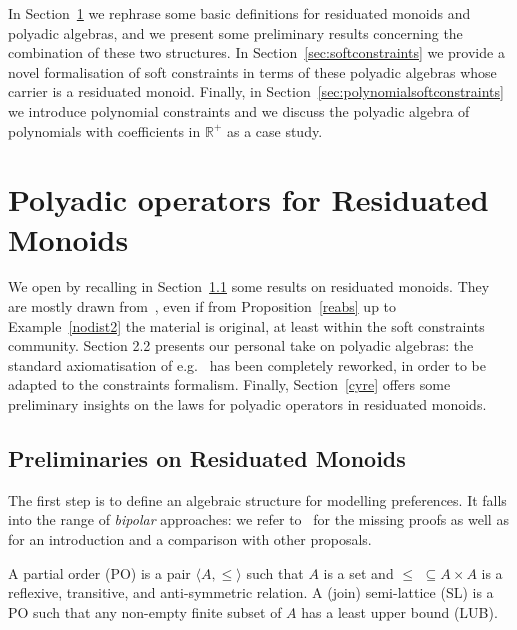 \documentclass{llncs}
\begin{document}
In Section~\ref{sec:bg} we rephrase some basic definitions for residuated monoids and polyadic algebras, and we present some preliminary results concerning the combination of 
these two structures.
%
In Section~\ref{sec:softconstraints} we provide a novel formalisation of soft constraints in terms of these polyadic algebras whose carrier is a residuated monoid. 
%
Finally, in Section~\ref{sec:polynomialsoftconstraints} we introduce polynomial constraints and we discuss the polyadic algebra of polynomials with coefficients in $\mathbb{R}^+$ as a case study.

\section{Polyadic operators for Residuated Monoids}\label{sec:bg}

We open by recalling in Section~\ref{sec:lem} some results on residuated monoids.
%
They are mostly drawn from~\cite{jlamp17}, even if from Proposition~\ref{reabs}
up to Example~\ref{nodist2} the material is original, at least within the
soft constraints community.
%
Section 2.2 presents our personal take on polyadic algebras:
the standard axiomatisation of e.g.~\cite{sagi2013} has been completely 
reworked, in order 
to be adapted to the constraints formalism.
%
Finally, Section~\ref{cyre} offers some preliminary insights on 
the laws for polyadic operators in residuated monoids.

\subsection{Preliminaries on Residuated Monoids}\label{sec:lem}

The first step is to define an algebraic structure for modelling preferences. 
It falls into the range of \emph{bipolar} approaches: we refer to~\cite{ipl17} 
for the missing proofs as well as for an introduction and a comparison with other proposals.

\begin{definition}[orders]
	A partial order (PO) is a pair $\langle A, \leq \rangle$ such that
	$A$ is a set %
	and $\leq \,\,\subseteq A \times A$ is a reflexive, transitive, and
	anti-symmetric  relation.
	A (join) semi-lattice (SL) is a PO such that any non-empty finite  subset of $A$ has a
	least upper bound (LUB).
\end{definition}
\end{document}
